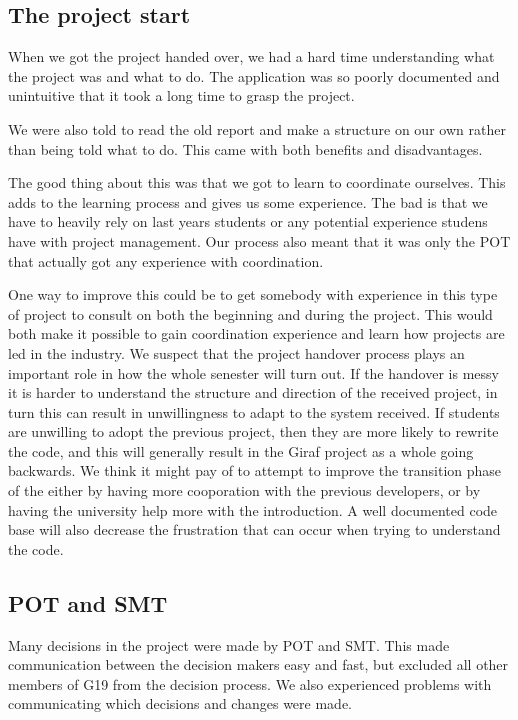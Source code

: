 \subsection{The project start}
When we got the project handed over, we had a hard time understanding what the project was and what to do. The application was so poorly documented and unintuitive that it took a long time to grasp the project.

We were also told to read the old report and make a structure on our own rather than being told what to do. This came with both benefits and disadvantages.

The good thing about this was that we got to learn to coordinate ourselves. This adds to the learning process and gives us some experience. The bad is that we have to heavily rely on last years students or any potential experience studens have with project management. Our process also meant that it was only the \gls{POT} that actually got any experience with coordination. 

One way to improve this could be to get somebody with experience in this type of project to consult on both the beginning and during the project. This would both make it possible to gain coordination experience and learn how projects are led in the industry. We suspect that the project handover process plays an important role in how the whole senester will turn out. If the handover is messy it is harder to understand the structure and direction of the received project, in turn this can result in unwillingness to adapt to the system received. If students are unwilling to adopt the previous project, then they are more likely to rewrite the code, and this will generally result in the Giraf project as a whole going backwards. We think it might pay of to attempt to improve the transition phase of the either by having more cooporation with the previous developers, or by having the university help more with the introduction. A well documented code base will also decrease the frustration that can occur when trying to understand the code.

\subsection{\gls{POT} and \gls{SMT}}
Many decisions in the project were made by \gls{POT} and \gls{SMT}. This made communication between the decision makers easy and fast, but excluded all other members of \gls{G19} from the decision process. We also experienced problems with communicating which decisions and changes were made.

